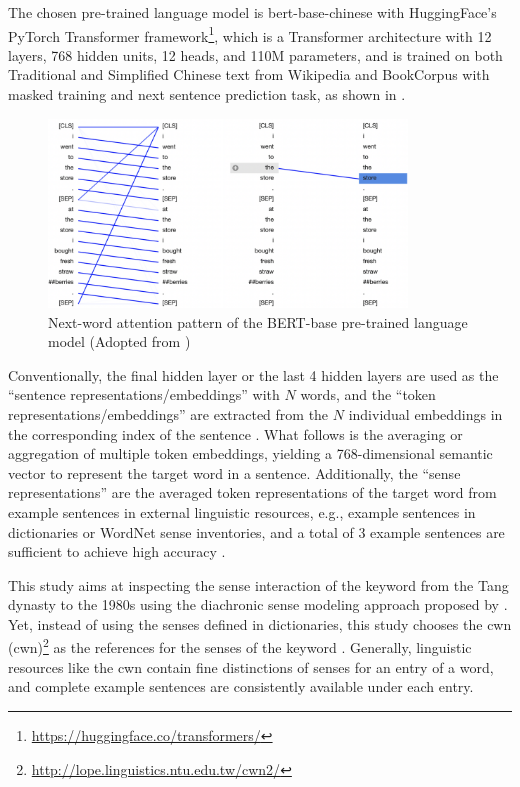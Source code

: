 The chosen pre-trained language model is bert-base-chinese \parencite{devlin2018bert} with HuggingFace's PyTorch Transformer framework\footnote{\url{https://huggingface.co/transformers/}}, which is a Transformer architecture with 12 layers, 768 hidden units, 12 heads, and 110M parameters, and is trained on both Traditional and Simplified Chinese text from Wikipedia and BookCorpus with masked training and next sentence prediction task, as shown in .

\begin{figure}[H]
  \centering
  \includegraphics[height=0.4\textheight,width=0.85\textwidth,keepaspectratio]{figures_ref/bertviz_next_word.png}
  \caption{Next-word attention pattern of the BERT-base pre-trained language model (Adopted from \textcite{vig2019multiscale})}
  \label{fig:bertviz_next_word}
\end{figure}

Conventionally, the final hidden layer or the last 4 hidden layers are used as the ``sentence representations/embeddings'' with $N$ words, and the ``token representations/embeddings'' are extracted from the $N$ individual embeddings in the corresponding index of the sentence \parencite{hu2019diachronic}. What follows is the averaging or aggregation of multiple token embeddings, yielding a 768-dimensional semantic vector to represent the target word in a sentence. Additionally, the ``sense representations'' are the averaged token representations of the target word from example sentences in external linguistic resources, e.g., example sentences in dictionaries or WordNet sense inventories, and a total of 3 example sentences are sufficient to achieve high accuracy \parencite{hu2019diachronic}.

This study aims at inspecting the sense interaction of the keyword \jia from the Tang dynasty to the 1980s using the diachronic sense modeling approach proposed by \textcite{hu2019diachronic}. Yet, instead of using the senses defined in dictionaries, this study chooses the \acrlong{cwn} (\acrshort{cwn})\footnote{\url{http://lope.linguistics.ntu.edu.tw/cwn2/}} \parencite{huang2010infrastructure} as the references for the senses of the keyword \jia\rspace . Generally, linguistic resources like the \gls{cwn} contain fine distinctions of senses for an entry of a word, and complete example sentences are consistently available under each entry.

